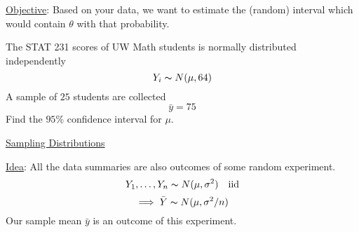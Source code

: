 \underline{Objective}: Based on your data, we want to estimate the (random)
interval which would contain $ \theta $ with that probability.
\begin{exbox}
    \begin{example}
        The STAT 231 scores of UW Math students is normally distributed independently
        \[ Y_i \thicksim N(\mu,64) \]
        A sample of $ 25 $ students are collected
        \[ \bar{y}=75 \]
        Find the $ 95\% $ confidence interval for $ \mu $.
    \end{example}
\end{exbox}
\underline{Sampling Distributions}

\underline{Idea}: All the data summaries are also outcomes of some random experiment.
\[ Y_1,\ldots ,Y_n \thicksim N(\mu,\sigma^2) \quad\text{iid}\]
\[ \implies \bar{Y} \thicksim N(\mu,\sigma^2/n) \]
Our sample mean $ \bar{y} $ is an outcome of this experiment.
